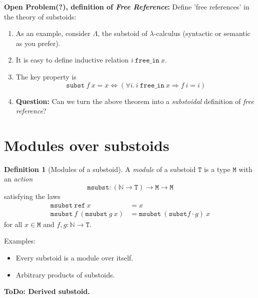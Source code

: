 \documentclass[a4paper,twoside,12pt]{article}
\theoremstyle{definition}
\newtheorem{definition}{Definition}
\theoremstyle{remark}
\newcommand{\NN}{\mathbb{N}}
\newcommand{\subst}{\mathtt{subst}}
\newcommand{\refe}{\mathtt{ref}}
\newcommand{\TT}{\mathtt{T}}
\newcommand{\MM}{\mathtt{M}}
\newcommand{\msubst}{\mathtt{msubst}}
\begin{document}
\textbf{Open Problem(?), definition of \emph{Free Reference}:}
Define 'free references' in the theory of substoids:
\begin{enumerate}
\item As an example, consider $\Lambda$, the substoid of
  $\lambda$-calculus (syntactic or semantic as you prefer).
\item It is easy to define inductive relation
  $i\ \mathtt{free\_in}\ x$.
\item The key property is
  \begin{equation*}
    \subst\ f\ x = x \Longleftrightarrow
    (\forall i.\, i\ \mathtt{free\_in}\ x \Longrightarrow f\ i = i)
  \end{equation*}
\item \textbf{Question:} Can we turn the above theorem into a
  \emph{substoidal} definition of \emph{free reference}?
\end{enumerate}

\section{Modules over substoids}
\label{sec:modules}

\begin{definition}[Modules of a substoid]
  A \emph{module} of a substoid $\TT$ is a type $\MM$ with an
  \emph{action}
  \begin{equation*}
    \msubst\colon (\NN\to \TT) \to \MM \to \MM
  \end{equation*}
  satisfying the laws
  \begin{align*}
    \msubst\ \refe\ x &= x\\
    \msubst\ f\ (\msubst\ g\ x) &= \msubst\ (\subst f \cdot g)\ x
  \end{align*}
  for all $x\in \MM$ and $f,g\colon \NN \to \TT$.
\end{definition}

Examples:
\begin{itemize}
\item Every substoid is a module over itself.
\item Arbitrary products of substoids.
\end{itemize}

\textbf{ToDo: Derived substoid.}
\end{document}

